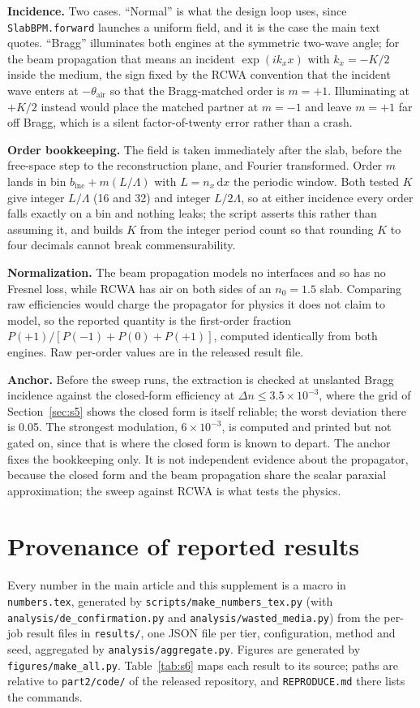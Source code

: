 \documentclass{optica-article}
\begin{document}
\textbf{Incidence.} Two cases. ``Normal'' is what the design loop uses, since
\texttt{SlabBPM.forward} launches a uniform field, and it is the case the main
text quotes. ``Bragg'' illuminates both engines at the symmetric two-wave angle;
for the beam propagation that means an incident $\exp(ik_xx)$ with
$k_x=-K/2$ inside the medium, the sign fixed by the RCWA convention that the
incident wave enters at $-\theta_{\text{air}}$ so that the Bragg-matched order
is $m=+1$. Illuminating at $+K/2$ instead would place the matched partner at
$m=-1$ and leave $m=+1$ far off Bragg, which is a silent factor-of-twenty
error rather than a crash.

\textbf{Order bookkeeping.} The field is taken immediately after the slab,
before the free-space step to the reconstruction plane, and Fourier
transformed. Order $m$ lands in bin $b_{\text{inc}}+m(L/\Lambda)$ with
$L=n_x\,\mathrm{d}x$ the periodic window. Both tested $K$ give integer
$L/\Lambda$ (16 and 32) and integer $L/2\Lambda$, so at either incidence every
order falls exactly on a bin and nothing leaks; the script asserts this rather
than assuming it, and builds $K$ from the integer period count so that rounding
$K$ to four decimals cannot break commensurability.

\textbf{Normalization.} The beam propagation models no interfaces and so has no
Fresnel loss, while RCWA has air on both sides of an $n_0=1.5$ slab. Comparing
raw efficiencies would charge the propagator for physics it does not claim to
model, so the reported quantity is the first-order fraction
$P(+1)/[P(-1)+P(0)+P(+1)]$, computed identically from both engines. Raw
per-order values are in the released result file.

\textbf{Anchor.} Before the sweep runs, the extraction is checked at unslanted
Bragg incidence against the closed-form efficiency at
$\Delta n\le3.5\times10^{-3}$, where the grid of Section~\ref{sec:s5} shows the
closed form is itself reliable; the worst deviation there is 0.05. The
strongest modulation, $6\times10^{-3}$, is computed and printed but not gated
on, since that is where the closed form is known to depart. The anchor fixes
the bookkeeping only. It is not independent evidence about the propagator,
because the closed form and the beam propagation share the scalar paraxial
approximation; the sweep against RCWA is what tests the physics.

\section{Provenance of reported results}
\label{sec:s12}
Every number in the main article and this supplement is a macro in
\texttt{numbers.tex}, generated by \texttt{scripts/make\_numbers\_tex.py}
(with \texttt{analysis/de\_confirmation.py} and
\texttt{analysis/wasted\_media.py}) from the per-job result files in
\texttt{results/}, one JSON file per tier, configuration, method and seed,
aggregated by \texttt{analysis/aggregate.py}. Figures are generated by
\texttt{figures/make\_all.py}. Table~\ref{tab:s6} maps each result to its
source; paths are relative to \texttt{part2/code/} of the released repository,
and \texttt{REPRODUCE.md} there lists the commands.
\end{document}
